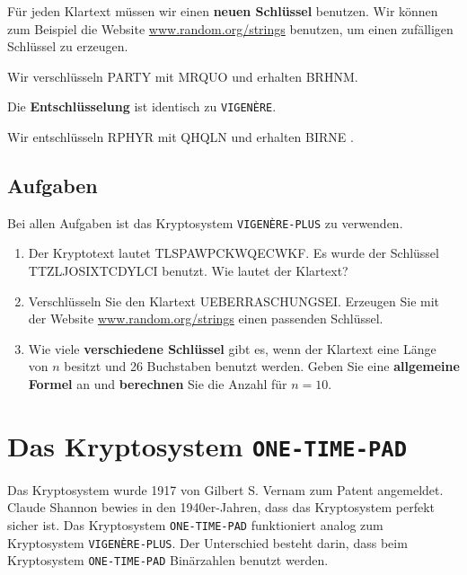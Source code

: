 Für jeden Klartext müssen wir einen \textbf{neuen Schlüssel} benutzen. Wir können zum Beispiel die Website \url{www.random.org/strings} benutzen, um einen zufälligen Schlüssel zu erzeugen.

\begin{example}
	Wir verschlüsseln PARTY mit MRQUO und erhalten BRHNM.
\end{example}

Die \textbf{Entschlüsselung} ist identisch zu \texttt{VIGENÈRE}.

\begin{example}
	Wir entschlüsseln RPHYR mit QHQLN und erhalten BIRNE .
\end{example}

\subsection{Aufgaben}

Bei allen Aufgaben ist das Kryptosystem \texttt{VIGENÈRE-PLUS} zu verwenden.

\begin{enumerate}

\item Der Kryptotext lautet TLSPAWPCKWQECWKF. Es wurde der Schlüssel TTZLJOSIXTCDYLCI benutzt. Wie lautet der Klartext?

\fillwithgrid{1in}

\item Verschlüsseln Sie den Klartext UEBERRASCHUNGSEI. Erzeugen Sie mit der Website \url{www.random.org/strings} einen passenden Schlüssel.

\fillwithgrid{1in}

\item Wie viele \textbf{verschiedene Schlüssel} gibt es, wenn der Klartext eine Länge von $n$ besitzt und \num{26} Buchstaben benutzt werden. Geben Sie eine \textbf{allgemeine Formel} an und \textbf{berechnen} Sie die Anzahl für $n = 10$.


\end{enumerate}

\newpage

\section{Das Kryptosystem \texttt{ONE-TIME-PAD}}

Das Kryptosystem wurde 1917 von Gilbert S. Vernam zum Patent angemeldet. Claude Shannon bewies in den 1940er-Jahren, dass das Kryptosystem perfekt sicher ist. Das Kryptosystem \texttt{ONE-TIME-PAD} funktioniert analog zum Kryptosystem \texttt{VIGENÈRE-PLUS}. Der Unterschied besteht darin, dass beim Kryptosystem \texttt{ONE-TIME-PAD} Binärzahlen benutzt werden.

